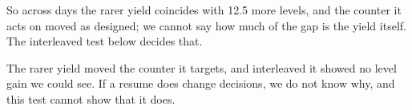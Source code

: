 So across days the rarer yield coincides with 12.5 more levels, and the counter it acts on moved as designed; we cannot say how much of the gap is the yield itself. %
The interleaved test below decides that.

\notebox{\interleavedresult} %

The rarer yield moved the counter it targets, and interleaved it showed no level gain we could see. If a resume does change decisions, we do not know why, and this test cannot show that it does.

